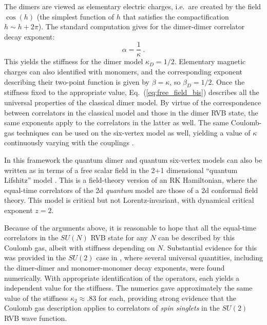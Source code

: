\documentclass[11pt]{iopart}
\begin{document}
The dimers are viewed as elementary electric charges, i.e.\ are created by the field $\cos(h)$ (the simplest function of $h$ that satisfies the compactification $h\sim h+2\pi$). The standard computation \cite{Nienhuis} gives for the dimer-dimer correlator decay exponent:
\begin{equation}
 \alpha=\frac{1}{\kappa}\ .
\end{equation}
This yields the stiffness for the dimer model $\kappa_D=1/2$. Elementary magnetic charges can also identified with monomers, and the corresponding exponent describing their two-point function is given by $\beta=\kappa$, so $\beta_D=1/2$.
Once the stiffness fixed to the appropriate value, Eq.~(\ref{eq:free_field_bis}) describes all the universal properties of the classical dimer model. By virtue of the correspondence between correlators in the classical model and those in the dimer RVB state, the same exponents apply to the correlators in the latter as well. 
The same Coulomb-gas techniques can be used on the six-vertex model as well, yielding a value of $\kappa$ continuously varying with the couplings \cite{Nienhuis}.


In this framework the quantum dimer and quantum six-vertex models can also be written as in terms of a free scalar field in the 2+1 dimensional ``quantum Lifshitz'' model \cite{Henley,QuantumLifshitz}. This is a field-theory version of an RK Hamiltonian, where the equal-time correlators of the 2d {\em quantum} model are those of a 2d conformal field theory. This model is critical but not Lorentz-invariant, with dynamical critical exponent $z=2$.

Because of the arguments above, it is reasonable to hope that all the equal-time correlators in the $SU(N)$ RVB state for any $N$ can be described by this Coulomb gas, albeit with stiffness depending on $N$. Substantial evidence for this was provided in the $SU(2)$ case in \cite{RVB2}, where several universal quantities, including the dimer-dimer and monomer-monomer decay exponents, were found numerically. With appropriate identification of the operators, each yields a independent value for the stiffness.  The numerics gave approximately the same value of the stiffness $\kappa_{2}\approx .83$ for each, providing strong evidence that the Coulomb gas description applies to correlators of {\em spin singlets} in the $SU(2)$ RVB wave function. 
\end{document}
